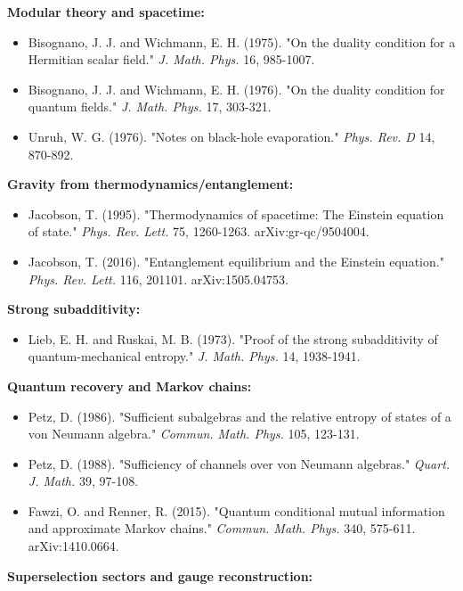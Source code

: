\textbf{Modular theory and spacetime:}

\begin{itemize}
\tightlist
\item
  Bisognano, J. J. and Wichmann, E. H. (1975). "On the duality condition for a Hermitian scalar field." \emph{J. Math. Phys.} 16, 985-1007.
\item
  Bisognano, J. J. and Wichmann, E. H. (1976). "On the duality condition for quantum fields." \emph{J. Math. Phys.} 17, 303-321.
\item
  Unruh, W. G. (1976). "Notes on black-hole evaporation." \emph{Phys. Rev. D} 14, 870-892.
\end{itemize}

\textbf{Gravity from thermodynamics/entanglement:}

\begin{itemize}
\tightlist
\item
  Jacobson, T. (1995). "Thermodynamics of spacetime: The Einstein equation of state." \emph{Phys. Rev. Lett.} 75, 1260-1263. arXiv:gr-qc/9504004.
\item
  Jacobson, T. (2016). "Entanglement equilibrium and the Einstein equation." \emph{Phys. Rev. Lett.} 116, 201101. arXiv:1505.04753.
\end{itemize}

\textbf{Strong subadditivity:}

\begin{itemize}
\tightlist
\item
  Lieb, E. H. and Ruskai, M. B. (1973). "Proof of the strong subadditivity of quantum-mechanical entropy." \emph{J. Math. Phys.} 14, 1938-1941.
\end{itemize}

\textbf{Quantum recovery and Markov chains:}

\begin{itemize}
\tightlist
\item
  Petz, D. (1986). "Sufficient subalgebras and the relative entropy of states of a von Neumann algebra." \emph{Commun. Math. Phys.} 105, 123-131.
\item
  Petz, D. (1988). "Sufficiency of channels over von Neumann algebras." \emph{Quart. J. Math.} 39, 97-108.
\item
  Fawzi, O. and Renner, R. (2015). "Quantum conditional mutual information and approximate Markov chains." \emph{Commun. Math. Phys.} 340, 575-611. arXiv:1410.0664.
\end{itemize}

\textbf{Superselection sectors and gauge reconstruction:}


